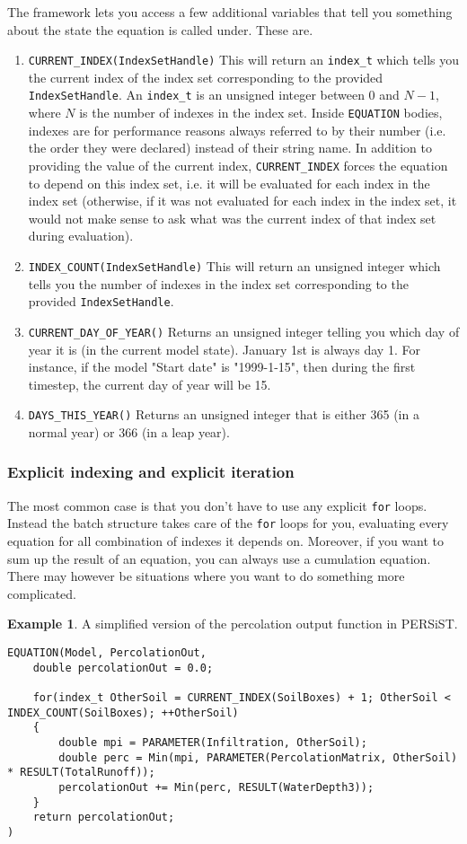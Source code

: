 \documentclass[11pt]{article}
\theoremstyle{definition}
\newtheorem{myexample}{Example}
\newenvironment{example}%
  {\begin{lrbox}{\examplebox}%
   \begin{minipage}{\dimexpr\linewidth-2\fboxsep}
   \begin{myexample}}%
  {\end{myexample}%
   \end{minipage}%
   \end{lrbox}%
   \begin{trivlist}
     \item[]\colorbox{silver}{\usebox\examplebox}
   \end{trivlist}}
\begin{document}
The framework lets you access a few additional variables that tell you something about the state the equation is called under. These are.
\begin{enumerate}[i]
\item {\tt CURRENT\_INDEX(IndexSetHandle)} This will return an {\tt index\_t} which tells you the current index of the index set corresponding to the provided {\tt IndexSetHandle}. An {\tt index\_t} is an unsigned integer between $0$ and $N-1$, where $N$ is the number of indexes in the index set. Inside {\tt EQUATION} bodies, indexes are for performance reasons always referred to by their number (i.e. the order they were declared) instead of their string name. In addition to providing the value of the current index, {\tt CURRENT\_INDEX} forces the equation to depend on this index set, i.e. it will be evaluated for each index in the index set (otherwise, if it was not evaluated for each index in the index set, it would not make sense to ask what was the current index of that index set during evaluation).
\item {\tt INDEX\_COUNT(IndexSetHandle)} This will return an unsigned integer which tells you the number of indexes in the index set corresponding to the provided {\tt IndexSetHandle}.
\item {\tt CURRENT\_DAY\_OF\_YEAR()} Returns an unsigned integer telling you which day of year it is (in the current model state). January 1st is always day 1. For instance, if the model "Start date" is "1999-1-15", then during the first timestep, the current day of year will be 15.
\item {\tt DAYS\_THIS\_YEAR()} Returns an unsigned integer that is either 365 (in a normal year) or 366 (in a leap year).
\end{enumerate}

\subsubsection{Explicit indexing and explicit iteration}

The most common case is that you don't have to use any explicit {\tt for} loops. Instead the batch structure takes care of the {\tt for} loops for you, evaluating every equation for all combination of indexes it depends on. Moreover, if you want to sum up the result of an equation, you can always use a cumulation equation. There may however be situations where you want to do something more complicated.

\begin{example}\label{ex:persistpercout}
A simplified version of the percolation output function in PERSiST.
\begin{lstlisting}[style=mycpp]
EQUATION(Model, PercolationOut,
	double percolationOut = 0.0;
	
	for(index_t OtherSoil = CURRENT_INDEX(SoilBoxes) + 1; OtherSoil < INDEX_COUNT(SoilBoxes); ++OtherSoil)
	{
		double mpi = PARAMETER(Infiltration, OtherSoil);
		double perc = Min(mpi, PARAMETER(PercolationMatrix, OtherSoil) * RESULT(TotalRunoff));
		percolationOut += Min(perc, RESULT(WaterDepth3));
	}
	return percolationOut;
)
\end{lstlisting}
\end{example}
\end{document}
